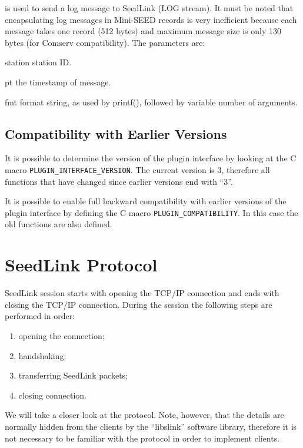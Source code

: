 \documentclass[11pt,a4paper,titlepage]{article}
\begin{document}
\begin{interface}
is used to send a log message to SeedLink (LOG stream). It must be noted
that encapsulating log messages in Mini-SEED records is very inefficient
because each message takes one record (512 bytes) and maximum message size
is only 130 bytes (for Comserv compatibility). The parameters are:
\begin{parameters}
\item[station] station ID.

\item[pt] the timestamp of message.

\item[fmt] format string, as used by printf(), followed by variable number
of arguments.
\end{parameters}

\end{interface}


\subsection{Compatibility with Earlier Versions}

It is possible to determine the version of the plugin interface by looking
at the C macro \verb+PLUGIN_INTERFACE_VERSION+. The current version is 3,
therefore all functions that have changed since earlier versions end with
``3''.

It is possible to enable full backward compatibility with earlier versions
of the plugin interface by defining the C macro
\verb+PLUGIN_COMPATIBILITY+. In this case the old functions are also
defined.


\section{SeedLink Protocol}

SeedLink session starts with opening the TCP/IP connection and ends with
closing the TCP/IP connection. During the session the following steps are
performed in order:
\begin{enumerate}
\item opening the connection;
\item handshaking;
\item transferring SeedLink packets;
\item closing connection.
\end{enumerate}

We will take a closer look at the protocol. Note, however, that the details
are normally hidden from the clients by the ``libslink'' software library,
therefore it is not necessary to be familiar with the protocol in order to
implement clients. 
\end{document}
